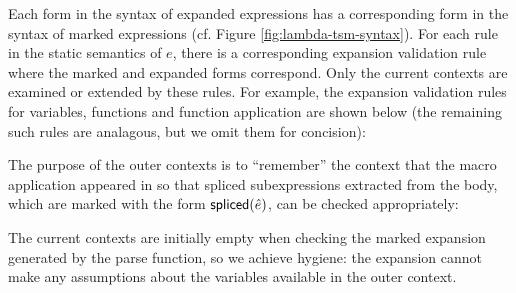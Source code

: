 \begin{enumerate}
Each form in the syntax of expanded expressions has a corresponding form in the syntax of marked expressions (cf. Figure \ref{fig:lambda-tsm-syntax}). For each rule in the static semantics of $e$, there is a corresponding expansion validation rule where the marked and expanded forms correspond. Only the current contexts are examined or extended by these rules. For example, the expansion validation rules for variables, functions and function application are shown below (the remaining such rules are analagous, but we omit them for concision):
\begin{mathpar}


\end{mathpar}

The purpose of the outer contexts is to ``remember'' the context that the macro application appeared in so that spliced subexpressions extracted from the body, which are marked with the form $\mathsf{spliced}(\ue)$, can be checked appropriately:
\begin{mathpar}
\end{mathpar}

The current contexts are initially empty when checking the marked expansion generated by the parse function, so we achieve hygiene: the expansion cannot make any assumptions about the variables available in the outer context. 
\end{enumerate}
